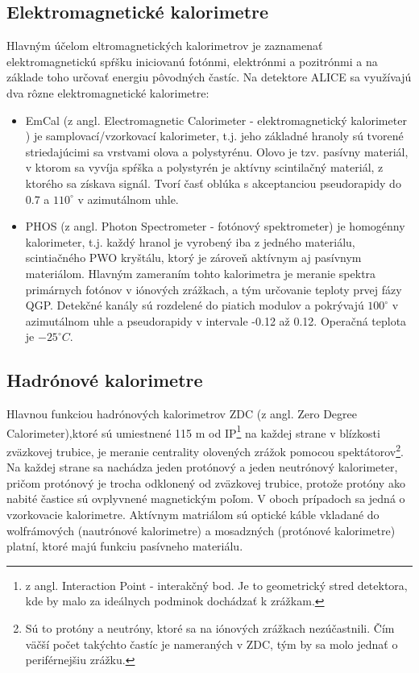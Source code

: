 \documentclass[thesismargins, thesislinespacing]{rnthesis}
\begin{document}
\subsection{Elektromagnetické kalorimetre}

Hlavným účelom eltromagnetických kalorimetrov je zaznamenať elektromagnetickú spŕšku iniciovanú fotónmi, elektrónmi a pozitrónmi a na základe toho určovať energiu pôvodných častíc. Na detektore ALICE sa využívajú dva rôzne elektromagnetické kalorimetre:
\begin{itemize}
	\item EmCal (z angl. Electromagnetic Calorimeter - elektromagnetický kalorimeter ) je samplovací/vzorkovací kalorimeter, t.j. jeho základné hranoly sú tvorené striedajúcimi sa vrstvami olova a polystyrénu. Olovo je tzv. pasívny materiál, v ktorom sa vyvíja spŕška a polystyrén je aktívny scintilačný materiál, z ktorého sa získava signál. Tvorí časť oblúka s akceptanciou pseudorapidy do 0.7 a $110^\circ$ v azimutálnom uhle.   
	\item PHOS (z angl. Photon Spectrometer - fotónový spektrometer) je homogénny kalorimeter, t.j. každý hranol je vyrobený iba z jedného materiálu, scintiačného PWO kryštálu, ktorý je zároveň aktívnym aj pasívnym materiálom. Hlavným zameraním tohto kalorimetra je meranie spektra primárnych fotónov v iónových zrážkach, a tým určovanie teploty prvej fázy QGP. Detekčné kanály sú rozdelené do piatich modulov a pokrývajú $100^\circ$ v azimutálnom uhle a pseudorapidy v intervale -0.12 až 0.12. Operačná teplota je $-25^\circ C$.
\end{itemize}

\subsection{Hadrónové kalorimetre}
Hlavnou funkciou hadrónových kalorimetrov ZDC (z angl. Zero Degree Calorimeter),ktoré sú umiestnené 115 m od IP\footnote{z angl. Interaction Point  - interakčný bod. Je to geometrický stred detektora, kde by malo za ideálnych podminok dochádzať k zrážkam.} na každej strane v blízkosti zväzkovej trubice, je meranie centrality olovených zrážok pomocou spektátorov\footnote{Sú to protóny a neutróny, ktoré sa na iónových zrážkach nezúčastnili. Čím väčší počet takýchto častíc je nameraných v ZDC, tým by sa molo jednať o periférnejšiu zrážku.}. Na každej strane sa nachádza jeden protónový a jeden neutrónový kalorimeter, pričom protónový je trocha odklonený od zväzkovej trubice, protože protóny ako nabité častice sú ovplyvnené magnetickým poľom. V oboch prípadoch sa jedná o vzorkovacie kalorimetre. Aktívnym matriálom sú optické káble vkladané do wolfrámových (nautrónové kalorimetre) a mosadzných (protónové kalorimetre) platní, ktoré majú funkciu pasívneho materiálu. 
\end{document}
